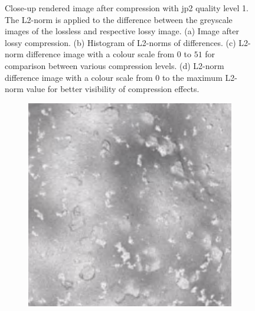 \begin{figure}[htb]
\begin{subfigure}[b]{0.48\textwidth}
        \caption{}
        \label{fig:img_quality_comp_jp2_1_center_diff_rel}
    \end{subfigure}
    \caption{Close-up rendered image after compression with \gls{jp2} quality level 1. The L2-norm is applied to the difference between the greyscale images of the lossless and respective lossy image. (a) Image after lossy compression. (b) Histogram of L2-norms of differences. (c) L2-norm difference image with a colour scale from $0$ to $51$ for comparison between various compression levels. (d) L2-norm difference image with a colour scale from $0$ to the maximum L2-norm value for better visibility of compression effects.}
    \label{fig:img_quality_comp_jp2_1_center}
\end{figure}

\begin{figure}[htb]
    \centering
    \begin{subfigure}[b]{0.48\textwidth}
        \centering
        \includegraphics[width=\textwidth]{doc/thesis/0_figures/compare_quality/set1/jp2_5_center}
        \caption{}
        \label{fig:img_quality_comp_jp2_5_center_orig}
    \end{subfigure}
    \begin{subfigure}[b]{0.48\textwidth}
        \centering

\end{subfigure}
\end{figure}
